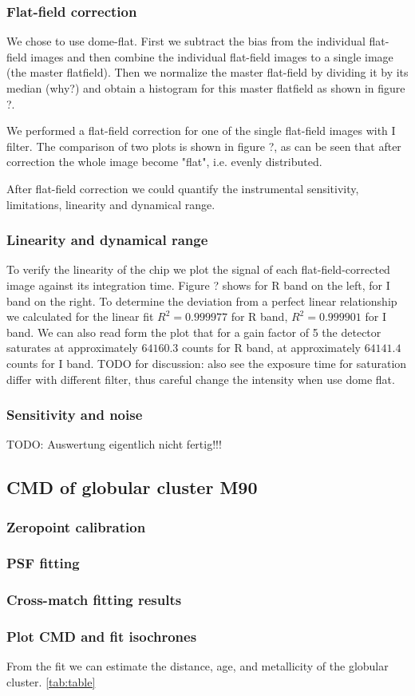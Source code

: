 \subsubsection{Flat-field correction}
We chose to use dome-flat. First we subtract the bias from the individual flat-field images and then combine the individual flat-field images to a single image (the master flatfield). Then we normalize the master flat-field by dividing it by its median (why?) and obtain a histogram for this master flatfield as shown in figure ?. 

We performed a flat-field correction for one of the single flat-field images with I filter. The comparison of two plots is shown in figure ?, as can be seen that after correction the whole image become "flat", i.e. evenly distributed. 

After flat-field correction we could quantify the instrumental sensitivity, limitations, linearity and dynamical range.
\subsubsection{Linearity and dynamical range}
To verify the linearity of the chip we plot the signal of each flat-field-corrected image against its integration time. Figure ? shows for R band on the left, for I band on the right. To determine the deviation from a perfect linear relationship we calculated for the linear fit $R^2 = 0.999977$ for R band, $R^2 = 0.999901$ for I band. We can also read form the plot that for a gain factor of 5 the detector saturates at approximately $64160.3$ counts for R band, at approximately $64141.4$ counts for I band.
TODO for discussion: also see the exposure time for saturation differ with different filter, thus careful change the intensity when use dome flat. 
\subsubsection{Sensitivity and noise}
TODO: Auswertung eigentlich nicht fertig!!!

\subsection{CMD of globular cluster M90}
\subsubsection{Zeropoint calibration}

\subsubsection{PSF fitting}

\subsubsection{Cross-match fitting results}

\subsubsection{Plot CMD and fit isochrones}
From the fit we can estimate the distance, age, and metallicity of the globular cluster. \ref{tab:table}
